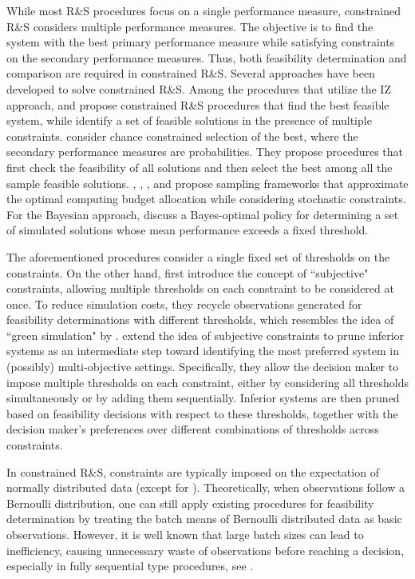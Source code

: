 \documentclass[11pt]{article}
\begin{document}
While most R\&S procedures focus on a single performance measure, constrained R\&S considers multiple performance measures. The objective is to find the system with the best primary performance measure while satisfying constraints on the secondary performance measures. Thus, both feasibility determination and comparison are required in constrained R\&S. Several approaches have been developed to solve constrained R\&S. Among the procedures that utilize the IZ approach, \citet{AndradottirKim2010} and \citet{Healey2013, Healey2014} propose constrained R\&S procedures that find the best feasible system, while \citet{BaturKim2010} identify a set of feasible solutions in the presence of multiple constraints. \citet{hong2015chance} consider chance constrained selection of the best, where the secondary performance measures are probabilities. They propose procedures that first check the feasibility
of all solutions and then select the best among all the sample feasible solutions. \citet{Lee2012}, \citet{HunterPasupathy2013}, \citet{Pasupathy2014}, and \citet{GaoChen2017} propose sampling frameworks that approximate the optimal computing budget allocation while considering stochastic constraints. 
For the Bayesian approach, \citet{XieFrazier2013} discuss a Bayes-optimal policy for determining a set of simulated solutions whose mean performance exceeds a fixed threshold.

The aforementioned procedures consider a single fixed set of thresholds on the constraints. On the other hand, \cite{zhou2022finding} first introduce the concept of ``subjective" constraints, allowing multiple thresholds on each constraint to be considered at once. To reduce simulation costs, they recycle observations generated for feasibility determinations with different thresholds, which resembles the idea of ``green simulation" by \cite{feng2017green}. \cite{Zhou2024} extend the idea of subjective constraints to prune inferior systems as an intermediate step toward identifying the most preferred system in (possibly) multi-objective settings. Specifically, they allow the decision maker to impose multiple thresholds on each constraint, either by considering all thresholds simultaneously or by adding them sequentially. Inferior systems are then pruned based on feasibility decisions with respect to these thresholds, together with the decision maker’s preferences over different combinations of thresholds across constraints.

In constrained R\&S, constraints are typically imposed on the expectation of normally distributed data (except for \citet{hong2015chance}). Theoretically, when observations follow a Bernoulli distribution, one can still apply existing procedures for feasibility determination by treating the batch means of Bernoulli distributed data as basic observations. However, it is well known that large batch sizes can lead to inefficiency, causing unnecessary waste of observations before reaching a decision, especially in fully sequential type procedures, see \cite{kim2006asymptotic}. 
\end{document}
